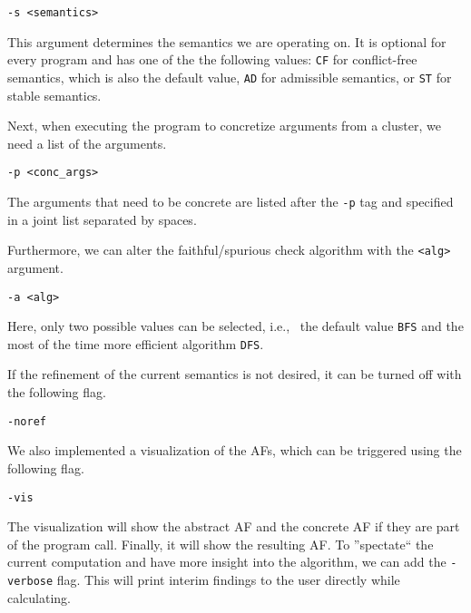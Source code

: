 \begin{center}
    \texttt{-s <semantics>}
\end{center}

This argument determines the semantics we are operating on. It is optional for every program and has one of the the following values: \texttt{CF} for conflict-free semantics, which is also the default value, \texttt{AD} for admissible semantics, or \texttt{ST} for stable semantics. 

Next, when executing the program to concretize arguments from a cluster, we need a list of the arguments.

\begin{center}
    \texttt{-p <conc\_args>} 
\end{center}

The arguments that need to be concrete are listed after the \texttt{-p} tag and specified in a joint list separated by spaces.

Furthermore, we can alter the faithful/spurious check algorithm with the \texttt{<alg>} argument.

\begin{center}
    \texttt{-a <alg>}
\end{center}

Here, only two possible values can be selected, i.e., \ the default value \texttt{BFS} and the most of the time more efficient algorithm \texttt{DFS}.

If the refinement of the current semantics is not desired, it can be turned off with the following flag.

\begin{center}
    \texttt{-noref}
\end{center}

We also implemented a visualization of the AFs, which can be triggered using the following flag.

\begin{center}
    \texttt{-vis}
\end{center}

The visualization will show the abstract AF and the concrete AF if they are part of the program call. Finally, it will show the resulting AF. To ''spectate`` the current computation and have more insight into the algorithm, we can add the \texttt{-verbose} flag. This will print interim findings to the user directly while calculating.
